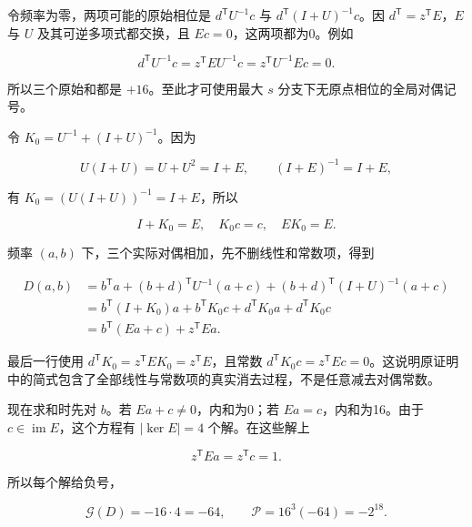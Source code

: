 \documentclass[UTF8,fontset=fandol,zihao=-4,openany,oneside]{ctexbook}
\begin{document}
令频率为零，两项可能的原始相位是 \(d^{\mathsf T}U^{-1}c\) 与 \(d^{\mathsf T}(I+U)^{-1}c\)。因 \(d^{\mathsf T}=z^{\mathsf T}E\)，\(E\) 与 \(U\) 及其可逆多项式都交换，且 \(Ec=0\)，这两项都为0。例如



\[
d^{\mathsf T}U^{-1}c=z^{\mathsf T}EU^{-1}c=z^{\mathsf T}U^{-1}Ec=0.
\]



所以三个原始和都是 \(+16\)。至此才可使用最大 \(s\) 分支下无原点相位的全局对偶记号。



令 \(K_0=U^{-1}+(I+U)^{-1}\)。因为



\[
U(I+U)=U+U^2=I+E,\qquad (I+E)^{-1}=I+E,
\]



有 \(K_0=(U(I+U))^{-1}=I+E\)，所以



\[
I+K_0=E,\quad K_0c=c,\quad EK_0=E.
\]



频率 \((a,b)\) 下，三个实际对偶相加，先不删线性和常数项，得到



\[
\begin{aligned}
D(a,b)
&=b^{\mathsf T}a+(b+d)^{\mathsf T}U^{-1}(a+c)
 +(b+d)^{\mathsf T}(I+U)^{-1}(a+c)\\
&=b^{\mathsf T}(I+K_0)a+b^{\mathsf T}K_0c
  +d^{\mathsf T}K_0a+d^{\mathsf T}K_0c\\
&=b^{\mathsf T}(Ea+c)+z^{\mathsf T}Ea.
\end{aligned}
\]



最后一行使用 \(d^{\mathsf T}K_0=z^{\mathsf T}EK_0=z^{\mathsf T}E\)，且常数 \(d^{\mathsf T}K_0c=z^{\mathsf T}Ec=0\)。这说明原证明中的简式包含了全部线性与常数项的真实消去过程，不是任意减去对偶常数。



现在求和时先对 \(b\)。若 \(Ea+c\ne0\)，内和为0；若 \(Ea=c\)，内和为16。由于 \(c\in\operatorname{im}E\)，这个方程有 \(|\ker E|=4\) 个解。在这些解上



\[
z^{\mathsf T}Ea=z^{\mathsf T}c=1.
\]



所以每个解给负号，



\[
\mathcal G(D)=-16\cdot4=-64,\qquad
\mathcal P=16^3(-64)=-2^{18}.
\]
\end{document}
